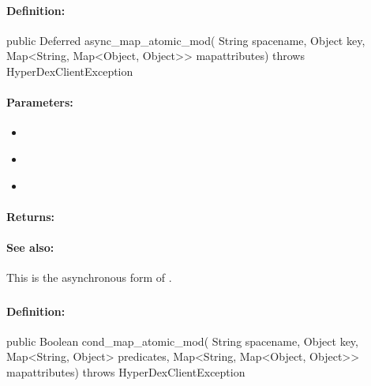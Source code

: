 \paragraph{Definition:}
\begin{javacode}
public Deferred async_map_atomic_mod(
        String spacename,
        Object key,
        Map<String, Map<Object, Object>> mapattributes) throws HyperDexClientException
\end{javacode}

\paragraph{Parameters:}
\begin{itemize}[noitemsep]
\item {}\\

\item {}\\

\item {}\\

\end{itemize}

\paragraph{Returns:}


\paragraph{See also:}  This is the asynchronous form of .

\pagebreak
\subsubsection{}
\label{api:java:cond_map_atomic_mod}


\paragraph{Definition:}
\begin{javacode}
public Boolean cond_map_atomic_mod(
        String spacename,
        Object key,
        Map<String, Object> predicates,
        Map<String, Map<Object, Object>> mapattributes) throws HyperDexClientException
\end{javacode}

